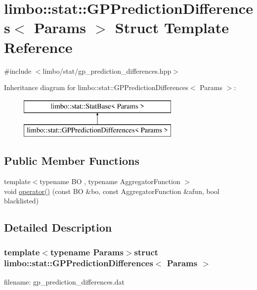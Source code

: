 \hypertarget{structlimbo_1_1stat_1_1_g_p_prediction_differences}{}\section{limbo\+:\+:stat\+:\+:G\+P\+Prediction\+Differences$<$ Params $>$ Struct Template Reference}
\label{structlimbo_1_1stat_1_1_g_p_prediction_differences}


{\ttfamily \#include $<$limbo/stat/gp\+\_\+prediction\+\_\+differences.\+hpp$>$}

Inheritance diagram for limbo\+:\+:stat\+:\+:G\+P\+Prediction\+Differences$<$ Params $>$\+:\begin{figure}[H]
\begin{center}
\leavevmode
\includegraphics[height=2.000000cm]{structlimbo_1_1stat_1_1_g_p_prediction_differences}
\end{center}
\end{figure}
\subsection*{Public Member Functions}
\begin{DoxyCompactItemize}
\item 
{\footnotesize template$<$typename B\+O , typename Aggregator\+Function $>$ }\\void \hyperlink{structlimbo_1_1stat_1_1_g_p_prediction_differences_ace7f84e5c4058524e5d7de45ec97f618}{operator()} (const B\+O \&bo, const Aggregator\+Function \&afun, bool blacklisted)
\end{DoxyCompactItemize}


\subsection{Detailed Description}
\subsubsection*{template$<$typename Params$>$struct limbo\+::stat\+::\+G\+P\+Prediction\+Differences$<$ Params $>$}

filename\+: {\ttfamily gp\+\_\+prediction\+\_\+differences.\+dat} 


